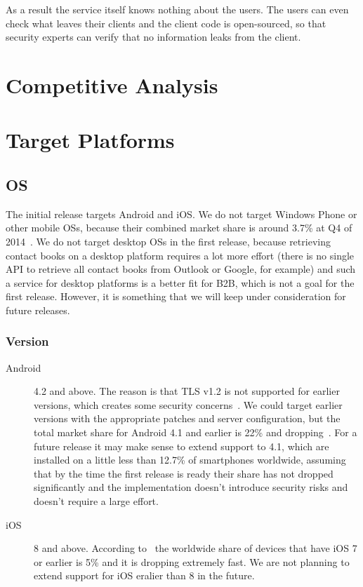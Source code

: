 \documentclass[a4paper, 10pt]{article}
\begin{document}
As a result the service itself knows nothing about the users. The users can even check what leaves their clients and the client code is open-sourced, so that security experts can 
verify that no information leaks from the client.

\section{Competitive Analysis}

\section{Target Platforms}

\subsection{OS}
The initial release targets Android and iOS. We do not target Windows Phone or other mobile OSs, because their combined market share is around 3.7\% at Q4 of 
2014~\cite{mobile_os_share}. We do not target desktop OSs in the first release, because retrieving contact books on a desktop platform requires a lot more effort (there is no 
single API to retrieve all contact books from Outlook or Google, for example) and such a service for desktop platforms is a better fit for B2B, which is not a goal for the first 
release. However, it is something that we will keep under consideration for future releases.

\subsubsection{Version}
\begin{description}
 \item[Android] 4.2 and above. The reason is that TLS v1.2 is not supported for earlier versions, which creates some security concerns~\cite{crypto_spec}. We could target 
earlier versions with the appropriate patches and server configuration, but the total market share for Android 4.1 and earlier is 22\% and dropping~\cite{android_version_share}. 
For a future release it may make sense to extend support to 4.1, which are installed on a little less than 12.7\% of smartphones worldwide, assuming that by the time the first 
release is ready their share has not dropped significantly and the implementation doesn't introduce security risks and doesn't require a large effort.
 \item[iOS] 8 and above. According to~\cite{ios_version_share} the worldwide share of devices that have iOS 7 or earlier is 5\% and it is dropping extremely fast. We are not 
planning to extend support for iOS eralier than 8 in the future.
\end{description}
\end{document}
